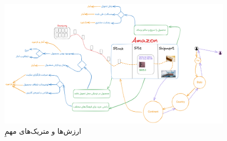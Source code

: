 \documentclass[12pt]{article}
\begin{document}
\begin{itemize}
\begin{figure}[b]
    \begin{center}
        \includegraphics[width=\textheight, height=\textwidth, angle=90]{../images/amazon-comp(2)}
    \end{center}
\caption{ارزش‌ها و متریک‌های مهمِ }\label{amz-comp}
\end{figure}
\end{itemize}
\end{document}
